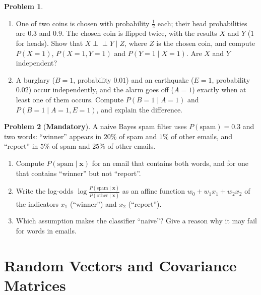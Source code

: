 \documentclass[11pt]{article}
\theoremstyle{definition}
\newtheorem{problem}{Problem}[section]
\newcommand{\mandatory}{\textcolor{red!70!black}{\textbf{Mandatory}}}
\newcommand{\indep}{\perp\!\!\!\perp}
\begin{document}
\begin{problem}\label{pr:cond-indep}
    \begin{enumerate}[label=(\alph*)]
        \item One of two coins is chosen with probability $\frac{1}{2}$ each; their head probabilities are $0.3$ and $0.9$. The chosen coin is flipped twice, with the results $X$ and $Y$ ($1$ for heads). Show that $X \indep Y \mid Z$, where $Z$ is the chosen coin, and compute $P(X = 1)$, $P(X = 1, Y = 1)$ and $P(Y = 1 \mid X = 1)$. Are $X$ and $Y$ independent?
        \item A burglary ($B = 1$, probability $0.01$) and an earthquake ($E = 1$, probability $0.02$) occur independently, and the alarm goes off ($A = 1$) exactly when at least one of them occurs. Compute $P(B = 1 \mid A = 1)$ and $P(B = 1 \mid A = 1, E = 1)$, and explain the difference.
    \end{enumerate}
\end{problem}

\begin{problem}[\mandatory]\label{pr:naive-bayes}
    A naive Bayes spam filter uses $P(\text{spam}) = 0.3$ and two words: ``winner'' appears in $20\%$ of spam and $1\%$ of other emails, and ``report'' in $5\%$ of spam and $25\%$ of other emails.
    \begin{enumerate}[label=(\alph*)]
        \item Compute $P(\text{spam} \mid \mathbf{x})$ for an email that contains both words, and for one that contains ``winner'' but not ``report''.
        \item Write the log-odds $\log\frac{P(\text{spam} \mid \mathbf{x})}{P(\text{other} \mid \mathbf{x})}$ as an affine function $w_0 + w_1x_1 + w_2x_2$ of the indicators $x_1$ (``winner'') and $x_2$ (``report'').
        \item Which assumption makes the classifier ``naive''? Give a reason why it may fail for words in emails.
    \end{enumerate}
\end{problem}

\section{Random Vectors and Covariance Matrices}
\end{document}
